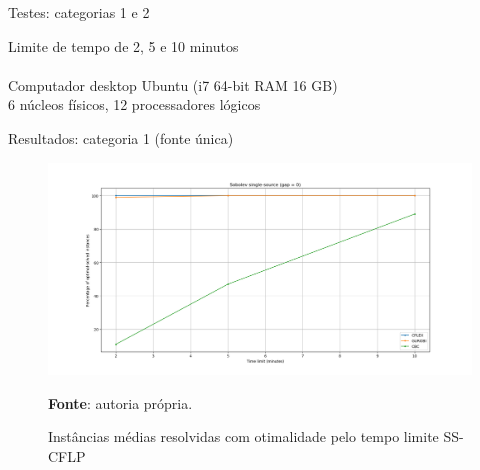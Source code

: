 \documentclass[aspectratio=169]{beamer}
\begin{document}
	\begin{frame}{Testes: categorias 1 e 2}
		
		Limite de tempo de 2, 5 e 10 minutos
		\\ \hfill \\
		Computador desktop Ubuntu (i7 64-bit RAM 16 GB)				
		\\ 6 núcleos físicos, 12 processadores lógicos
		
			
	\end{frame}


	\begin{frame}{Resultados: categoria 1 (fonte única)} %
	
		\begin{figure}[H]
			\begin{center}
				\caption{Instâncias médias resolvidas com otimalidade pelo tempo limite SS-CFLP \cite{Sobolev}}
				
				\includegraphics[height=0.6\textheight]{res/Sobolev SS - Optimal x Time.png}
				\label{Opt:T:SS:Sobolev}
				
				\textbf{Fonte}: autoria própria.
			\end{center}
		\end{figure}
	
	\end{frame}
\end{document}
